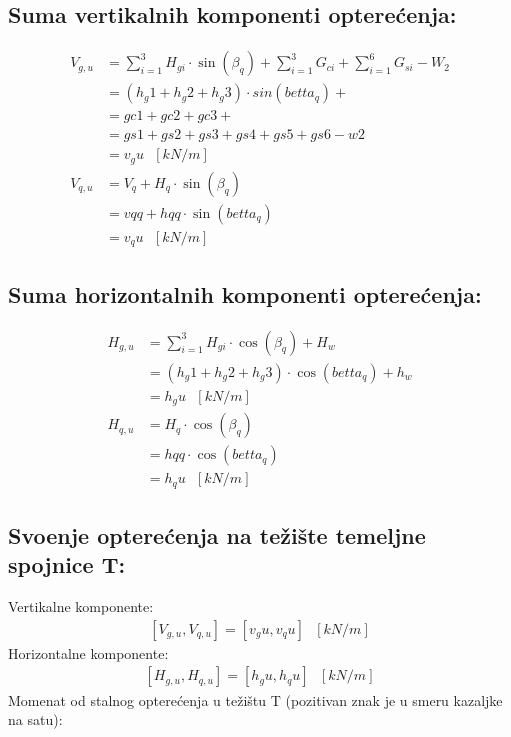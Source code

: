\documentclass[a4paper, 11pt]{article}
\begin{document}
\subsection*{Suma vertikalnih komponenti optere\'cenja:}

\begin{align*}
V_{g,u} &= \sum_{i=1}^{3} H_{gi} \cdot \sin(\beta_{q}) + \sum_{i=1}^3 {G_{ci}} + \sum_{i=1}^{6} {G_{si}} -W_{2} \\
		&= \left( h_g1 + h_g2 + h_g3 \right) \cdot sin(betta_q)+  \\
		&= gc1+gc2+gc3 + \\
		&= gs1+gs2+gs3+gs4+gs5+gs6 - w2 \\
		&= v_gu \text{ } [kN/m] \\
V_{q,u} &= V_{q} + H_{q} \cdot \sin(\beta_{q}) \\
		&= vqq + hqq \cdot \sin (betta_q) \\
		&= v_qu \text{ } [kN/m]
\end{align*}

\subsection*{Suma horizontalnih komponenti optere\'cenja:}

\begin{align*}
H_{g,u} &= \sum_{i=1}^{3} H_{gi} \cdot \cos(\beta_{q}) + H_{w} \\
		&=  \left( h_g1 + h_g2 + h_g3 \right) \cdot \cos (betta_q) + h_w \\
		&= h_gu \text{ } [kN/m] \\
H_{q,u} &= H_{q} \cdot \cos (\beta_{q}) \\
		&= hqq \cdot \cos (betta_q) \\
		&= h_qu \text{ } [kN/m]
\end{align*}

\subsection*{Svo\dj enje optere\'cenja na te\v{z}i\v{s}te temeljne spojnice T:}
Vertikalne komponente:
\begin{align*}
\left[V_{g,u}, V_{q,u} \right] = \left[v_gu, v_qu \right] \text{ } [kN/m]
\end{align*}
Horizontalne komponente:
\begin{align*}
\left[ H_{g,u}, H_{q,u} \right] = \left[ h_gu, h_qu \right] \text{ } [kN/m]
\end{align*}
Momenat od stalnog optere\'cenja u te\v{z}i\v{s}tu T (pozitivan znak je u smeru kazaljke na satu):
\end{document}
